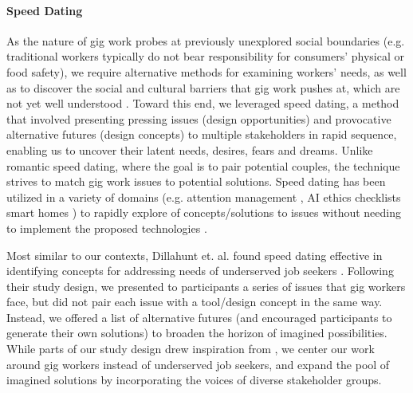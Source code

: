 \paragraph{Speed Dating}
As the nature of gig work probes at previously unexplored social boundaries (e.g. traditional workers typically do not bear responsibility for consumers' physical or food safety), we require alternative methods for examining workers' needs, as well as to discover the social and cultural barriers that gig work pushes at, which are not yet well understood \cite{Davidoff2007-fq,Zimmerman2017-rq}.
Toward this end, we leveraged speed dating, a method that involved presenting pressing issues (design opportunities) and provocative alternative futures (design concepts) to multiple stakeholders in rapid sequence, enabling us to uncover their latent needs, desires, fears and dreams. 
Unlike romantic speed dating, where the goal is to pair potential couples, the technique strives to match gig work issues to potential solutions. 
Speed dating has been utilized in a variety of domains (e.g. attention management \cite{chou2022because}, AI ethics checklists \cite{madaio2020co} smart homes \cite{jin2022exploring}) to rapidly explore of concepts/solutions to issues without needing to implement the proposed technologies \cite{Davidoff2007-fq}. 

Most similar to our contexts, Dillahunt et. al. found speed dating effective in identifying concepts for addressing needs of underserved job seekers \cite{dillahunt2018designing}. 
Following their study design, we presented to participants a series of issues that gig workers face, but did not pair each issue with a tool/design concept in the same way. 
Instead, we offered a list of alternative futures (and encouraged participants to generate their own solutions) to broaden the horizon of imagined possibilities. 
While parts of our study design drew inspiration from \cite{dillahunt2018designing}, we center our work around gig workers instead of underserved job seekers, and expand the pool of imagined solutions by incorporating the voices of diverse stakeholder groups. 

